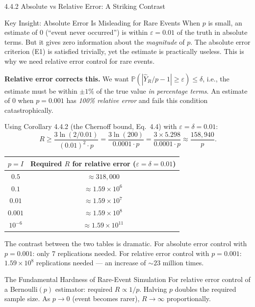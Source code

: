 \documentclass[aspectratio=169,10pt]{beamer}
\begin{document}
\begin{frame}[allowframebreaks]{4.4.2 Absolute vs Relative Error: A Striking Contrast}
\begin{alertblock}{Key Insight: Absolute Error Is Misleading for Rare Events}
  When $p$ is small, an estimate of 0 (``event never occurred'') is within
  $\varepsilon = 0.01$ of the truth in absolute terms.  But it gives zero
  information about the \emph{magnitude} of $p$.  The absolute error criterion
  (E1) is satisfied trivially, yet the estimate is practically useless.
  This is why we need relative error control for rare events.
\end{alertblock}

\medskip
\textbf{Relative error corrects this.}
We want $\mathbb{P}(|\hat{Y}_R/p - 1| \geq \varepsilon) \leq \delta$, i.e., the
estimate must be within $\pm 1\%$ of the true value \emph{in percentage terms}.
An estimate of 0 when $p = 0.001$ has \emph{100\% relative error} and fails
this condition catastrophically.

Using Corollary 4.4.2 (the Chernoff bound, Eq.\ 4.4) with $\varepsilon = \delta = 0.01$:
\[
  R \geq \frac{3\ln(2/0.01)}{(0.01)^2 \cdot p}
    = \frac{3\ln(200)}{0.0001 \cdot p}
    = \frac{3 \times 5.298}{0.0001 \cdot p}
    \approx \frac{158{,}940}{p}.
\]

\begin{center}
  \begin{tabular}{cc}
    \toprule
    $p = I$ & Required $R$ for relative error ($\varepsilon = \delta = 0.01$) \\
    \midrule
    $0.5$       & $\approx 318{,}000$ \\
    $0.1$       & $\approx 1.59 \times 10^6$ \\
    $0.01$      & $\approx 1.59 \times 10^7$ \\
    $0.001$     & $\approx 1.59 \times 10^8$ \\
    $10^{-6}$   & $\approx 1.59 \times 10^{11}$ \\
    \bottomrule
  \end{tabular}
\end{center}

\framebreak

The contrast between the two tables is dramatic.  For absolute error control with
$p = 0.001$: only 7 replications needed.  For relative error control with
$p = 0.001$: $1.59 \times 10^8$ replications needed --- an increase of
$\sim 23$ million times.

\begin{alertblock}{The Fundamental Hardness of Rare-Event Simulation}
  For relative error control of a Bernoulli$(p)$ estimator:
  required $R \propto 1/p$.  Halving $p$ doubles the required sample size.
  As $p \to 0$ (event becomes rarer), $R \to \infty$ proportionally.


\end{alertblock}
\end{frame}
\end{document}
